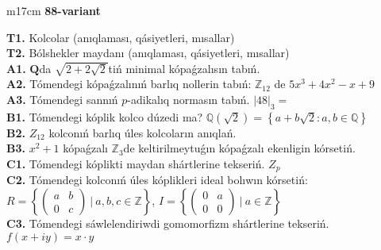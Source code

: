\documentclass{article}
\begin{document}
\begin{tabular}{m{17cm}}
\textbf{88-variant}
\newline

\textbf{T1.} Kolcolar (anıqlaması, qásiyetleri, mısallar) \\
\textbf{T2.} Bólshekler maydanı (anıqlaması, qásiyetleri, mısallar) \\
\textbf{A1.} \(\mathbf{Q}\)da \(\sqrt{2 + 2\sqrt{2}}\)tiń minimal kópaǵzalısın tabıń. \\
\textbf{A2.} Tómendegi kópaǵzalınıń barlıq nollerin tabıń: \(\mathbb{Z}_{12}\) de \(5x^{3} + 4x^{2} - x + 9\) \\
\textbf{A3.} Tómendegi sannıń \(p\)-adikalıq normasın tabıń. \(|48|_{3} =\) \\
\textbf{B1.} Tómendegi kóplik kolco dúzedi ma? \(\mathbb{Q}\left( \sqrt{2} \right) = \left\{ a + b\sqrt{2}:a,b \in \mathbb{Q} \right\}\) \\
\textbf{B2.} \(Z_{12}\) kolconıń barlıq úles kolcoların anıqlań. \\
\textbf{B3.} \(x^{2} + 1\) kópaǵzalı \(\mathbb{Z}_{3}\)de keltirilmeytuǵın kópaǵzalı ekenligin kórsetiń. \\
\textbf{C1.} Tómendegi kóplikti maydan shártlerine tekseriń. \(Z_{p}\) \\
\textbf{C2.} Tómendegi kolconıń úles kóplikleri ideal bolıwın kórsetiń:
\(R = \left\{ \begin{pmatrix}
a & b \\
0 & c
\end{pmatrix}\ |\ a,b,c \in \mathbb{Z} \right\}\), \(I = \left\{ \begin{pmatrix}
0 & a \\
0 & 0
\end{pmatrix}\ |\ a \in \mathbb{Z} \right\}\) \\
\textbf{C3.} Tómendegi sáwlelendiriwdi gomomorfizm shártlerine tekseriń. \(f(x + iy) = x \cdot y\) \\

\end{tabular}
\vspace{1cm}
\end{document}
